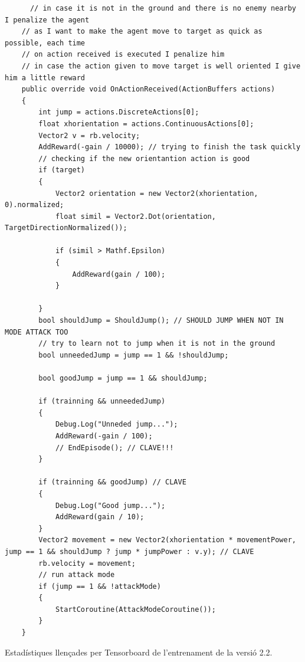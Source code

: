 \documentclass{article}
\begin{document}
       \begin{lstlisting}
      // in case it is not in the ground and there is no enemy nearby I penalize the agent
    // as I want to make the agent move to target as quick as possible, each time
    // on action received is executed I penalize him
    // in case the action given to move target is well oriented I give him a little reward
    public override void OnActionReceived(ActionBuffers actions)
    {
        int jump = actions.DiscreteActions[0];
        float xhorientation = actions.ContinuousActions[0];
        Vector2 v = rb.velocity;
        AddReward(-gain / 10000); // trying to finish the task quickly 
        // checking if the new orientantion action is good
        if (target)
        {
            Vector2 orientation = new Vector2(xhorientation, 0).normalized;
            float simil = Vector2.Dot(orientation, TargetDirectionNormalized());

            if (simil > Mathf.Epsilon)
            {
                AddReward(gain / 100);
            }

        }
        bool shouldJump = ShouldJump(); // SHOULD JUMP WHEN NOT IN MODE ATTACK TOO
        // try to learn not to jump when it is not in the ground
        bool unneededJump = jump == 1 && !shouldJump;

        bool goodJump = jump == 1 && shouldJump;

        if (trainning && unneededJump)
        {
            Debug.Log("Unneded jump...");
            AddReward(-gain / 100);
            // EndEpisode(); // CLAVE!!!
        }

        if (trainning && goodJump) // CLAVE
        {
            Debug.Log("Good jump...");
            AddReward(gain / 10);
        }
        Vector2 movement = new Vector2(xhorientation * movementPower, jump == 1 && shouldJump ? jump * jumpPower : v.y); // CLAVE
        rb.velocity = movement;
        // run attack mode
        if (jump == 1 && !attackMode)
        {
            StartCoroutine(AttackModeCoroutine());
        }
    }
    \end{lstlisting}

    Estadístiques llençades per Tensorboard de l'entrenament de la versió 2.2. 
    
\end{document}

